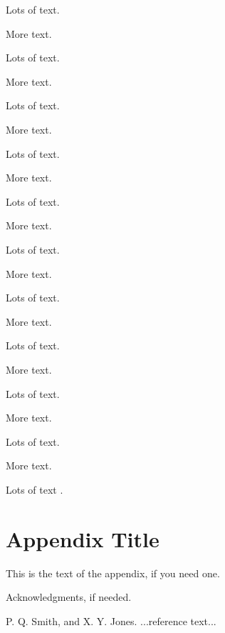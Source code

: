 \documentclass[10pt,numbers]{sigplanconf}
\begin{document}
Lots of text.

More text.

Lots of text.

More text.

Lots of text.

More text.

Lots of text.

More text.

Lots of text.

More text.

Lots of text.

More text.

Lots of text.

More text.

Lots of text.

More text.

Lots of text.

More text.

Lots of text.

More text.

Lots of text \cite{smith02}.

\appendix
\section{Appendix Title}

This is the text of the appendix, if you need one.

\acks

Acknowledgments, if needed.





\begin{thebibliography}{}
\softraggedright

P. Q. Smith, and X. Y. Jones. ...reference text...

\end{thebibliography}
\end{document}
